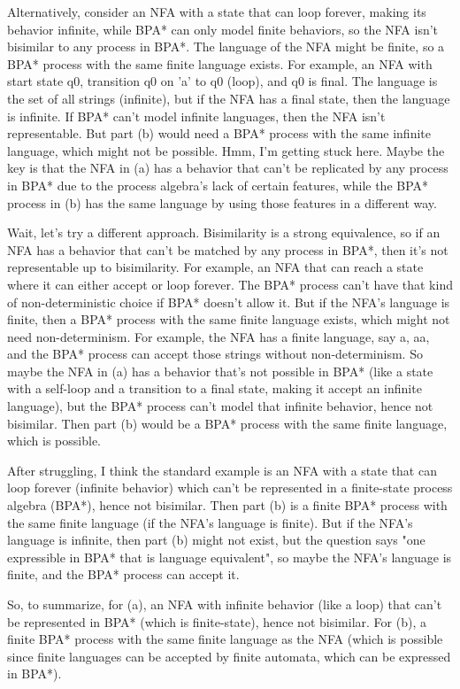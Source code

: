 Alternatively, consider an NFA with a state that can loop forever, making its behavior infinite, while BPA* can only model finite behaviors, so the NFA isn't bisimilar to any process in BPA*. The language of the NFA might be finite, so a BPA* process with the same finite language exists. For example, an NFA with start state q0, transition q0 on 'a' to q0 (loop), and q0 is final. The language is the set of all strings (infinite), but if the NFA has a final state, then the language is infinite. If BPA* can't model infinite languages, then the NFA isn't representable. But part (b) would need a BPA* process with the same infinite language, which might not be possible. Hmm, I'm getting stuck here. Maybe the key is that the NFA in (a) has a behavior that can't be replicated by any process in BPA* due to the process algebra's lack of certain features, while the BPA* process in (b) has the same language by using those features in a different way.

Wait, let's try a different approach. Bisimilarity is a strong equivalence, so if an NFA has a behavior that can't be matched by any process in BPA*, then it's not representable up to bisimilarity. For example, an NFA that can reach a state where it can either accept or loop forever. The BPA* process can't have that kind of non-deterministic choice if BPA* doesn't allow it. But if the NFA's language is finite, then a BPA* process with the same finite language exists, which might not need non-determinism. For example, the NFA has a finite language, say {a, aa}, and the BPA* process can accept those strings without non-determinism. So maybe the NFA in (a) has a behavior that's not possible in BPA* (like a state with a self-loop and a transition to a final state, making it accept an infinite language), but the BPA* process can't model that infinite behavior, hence not bisimilar. Then part (b) would be a BPA* process with the same finite language, which is possible.

After struggling, I think the standard example is an NFA with a state that can loop forever (infinite behavior) which can't be represented in a finite-state process algebra (BPA*), hence not bisimilar. Then part (b) is a finite BPA* process with the same finite language (if the NFA's language is finite). But if the NFA's language is infinite, then part (b) might not exist, but the question says "one expressible in BPA* that is language equivalent", so maybe the NFA's language is finite, and the BPA* process can accept it.

So, to summarize, for (a), an NFA with infinite behavior (like a loop) that can't be represented in BPA* (which is finite-state), hence not bisimilar. For (b), a finite BPA* process with the same finite language as the NFA (which is possible since finite languages can be accepted by finite automata, which can be expressed in BPA*).

